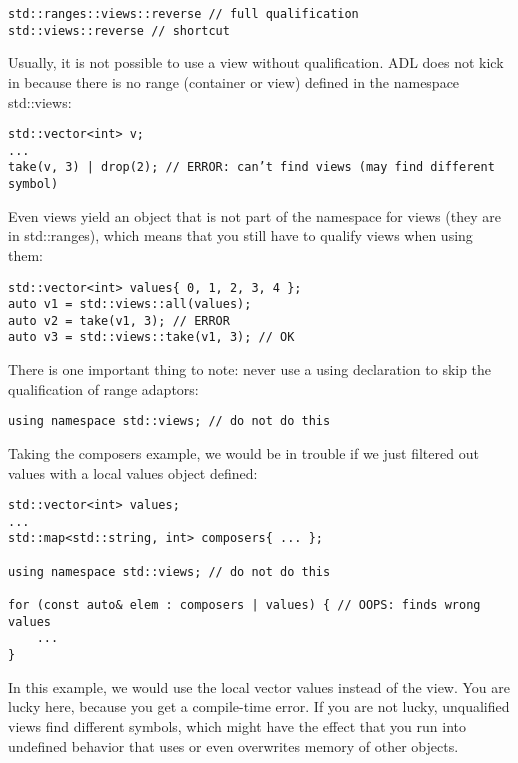 \begin{lstlisting}[style=styleCXX]
std::ranges::views::reverse // full qualification
std::views::reverse // shortcut
\end{lstlisting}

Usually, it is not possible to use a view without qualification. ADL does not kick in because there is no range (container or view) defined in the namespace std::views:

\begin{lstlisting}[style=styleCXX]
std::vector<int> v;
...
take(v, 3) | drop(2); // ERROR: can’t find views (may find different symbol)
\end{lstlisting}

Even views yield an object that is not part of the namespace for views (they are in std::ranges), which means that you still have to qualify views when using them:

\begin{lstlisting}[style=styleCXX]
std::vector<int> values{ 0, 1, 2, 3, 4 };
auto v1 = std::views::all(values);
auto v2 = take(v1, 3); // ERROR
auto v3 = std::views::take(v1, 3); // OK
\end{lstlisting}

There is one important thing to note: never use a using declaration to skip the qualification of range adaptors:

\begin{lstlisting}[style=styleCXX]
using namespace std::views; // do not do this
\end{lstlisting}

Taking the composers example, we would be in trouble if we just filtered out values with a local values object defined:

\begin{lstlisting}[style=styleCXX]
std::vector<int> values;
...
std::map<std::string, int> composers{ ... };

using namespace std::views; // do not do this

for (const auto& elem : composers | values) { // OOPS: finds wrong values
	...
}
\end{lstlisting}

In this example, we would use the local vector values instead of the view. You are lucky here, because you get a compile-time error. If you are not lucky, unqualified views find different symbols, which might have the effect that you run into undefined behavior that uses or even overwrites memory of other objects.
